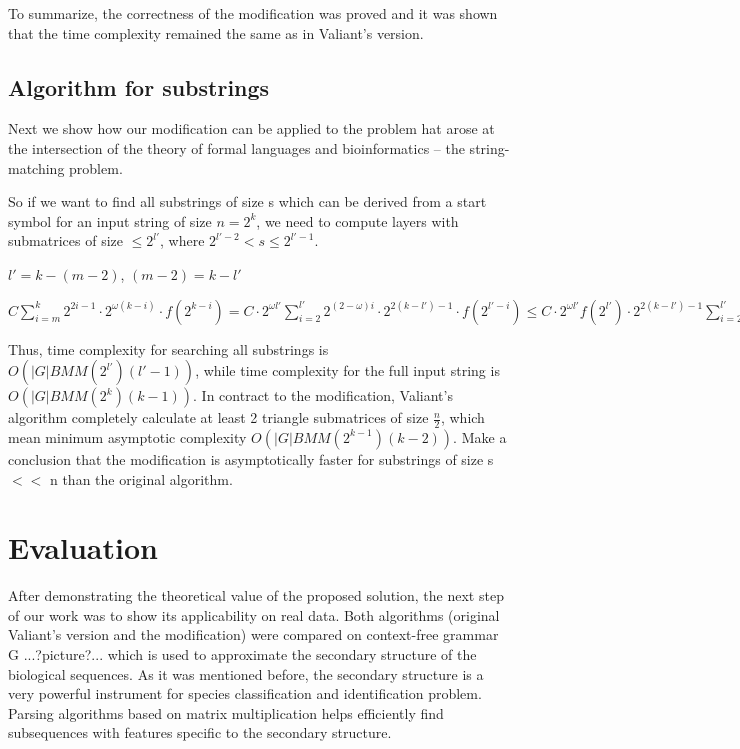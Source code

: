 \documentclass[runningheads]{llncs}
\begin{document}
To summarize, the correctness of the modification was proved and it was shown that the time complexity remained the same as in Valiant's version.

\subsection{Algorithm for substrings}

Next we show how our modification can be applied to the problem hat  arose  at  the  intersection  of  the  theory  of  formal  languages and bioinformatics -- the string-matching problem.

So if we want to find all substrings of size s which can be derived from a start symbol for an input string of size $n = 2^k$, we need to compute layers with submatrices of size $\le 2^{l'}$, where $ 2^{l' - 2} < s \le 2^{l' - 1}$.

$l' = k - (m - 2)$, $(m - 2) = k - l'$

$ C \sum\limits_{i=m}^k 2^{2i - 1} \cdot 2^{\omega(k - i)} \cdot f(2^{k - i}) = C \cdot 2^{\omega l'}\sum\limits_{i=2}^{l'} 2^{(2 - \omega)i} \cdot 2^{2(k - l') - 1} \cdot f(2^{l' - i}) \le C \cdot 2^{\omega l'} f(2^{l'}) \cdot 2^{2(k - l') - 1} \sum\limits_{i=2}^{l'} 2^{(2 - \omega)i} = BMM(2^{l'}) \cdot 2^{2(k - l') - 1} \sum\limits_{i=2}^{l'} 2^{(2 - \omega)i}$ 

Thus, time complexity for searching all substrings is  $O(|G|BMM(2^{l'})(l' - 1))$, while time complexity for the full input string is $O(|G|BMM(2^k)(k - 1))$. In contract to the modification, Valiant's algorithm completely calculate at least 2 triangle submatrices of size $\frac{n}{2}$, which mean minimum asymptotic complexity  $O(|G|BMM(2^{k - 1})(k - 2))$. Make a conclusion that the modification is asymptotically faster for substrings of size s $<<$ n  than the original algorithm. 

\section{Evaluation}

After demonstrating the theoretical value of the proposed solution, the next step of our work was to show its applicability on real data. Both algorithms (original Valiant's version and the modification) were compared on context-free grammar G  ...?picture?...  which is used to approximate the secondary structure of the biological sequences. As it was mentioned before, the secondary structure is a very powerful instrument for species classification and identification problem. Parsing algorithms based on matrix multiplication helps efficiently find subsequences with features specific to the secondary structure.
\end{document}
